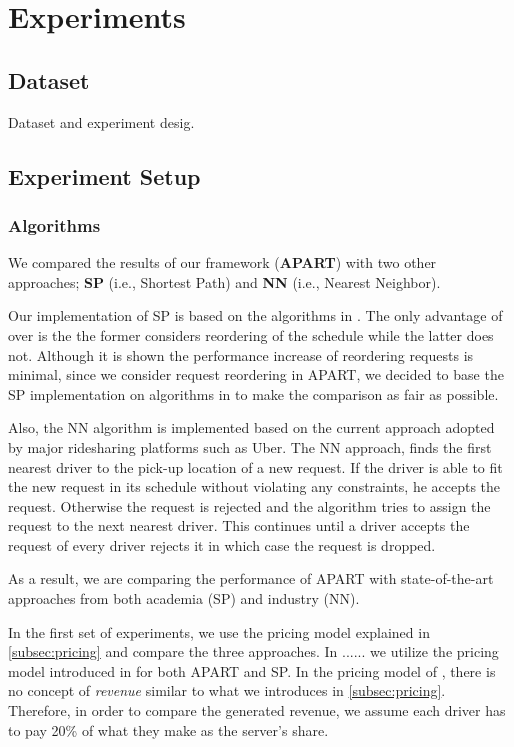 \section{Experiments}

\subsection{Dataset}
Dataset and experiment desig.

\subsection{Experiment Setup}

\subsubsection{Algorithms}
We compared the results of our framework (\textbf{APART}) with two other approaches; \textbf{SP} (i.e., Shortest Path) and \textbf{NN} (i.e., Nearest Neighbor).

Our implementation of SP is based on the algorithms in \cite{Huang14}. The only advantage of \cite{Huang14} over \cite{Ma2013} is the the former considers reordering of the schedule while the latter does not. Although it is shown the performance increase of reordering requests is minimal, since we consider request reordering in APART, we decided to base the SP implementation on algorithms in \cite{Huang14} to make the comparison as fair as possible.

Also, the NN algorithm is implemented based on the current approach adopted by major ridesharing platforms such as Uber. The NN approach, finds the first nearest driver to the pick-up location of a new request. If the driver is able to fit the new request in its schedule without violating any constraints, he accepts the request. Otherwise the request is rejected and the algorithm tries to assign the request to the next nearest driver. This continues until a driver accepts the request of every driver rejects it in which case the request is dropped.

As a result, we are comparing the performance of APART with state-of-the-art approaches from both academia (SP) and industry (NN).

In the first set of experiments, we use the pricing model explained in \cref{subsec:pricing} and compare the three approaches. In ...... we utilize the pricing model introduced in \cite{Ma2015} for both APART and SP. In the pricing model of \cite{Ma2015}, there is no concept of \textit{revenue} similar to what we introduces in \cref{subsec:pricing}. Therefore, in order to compare the generated revenue, we assume each driver has to pay 20\% of what they make as the server's share.

